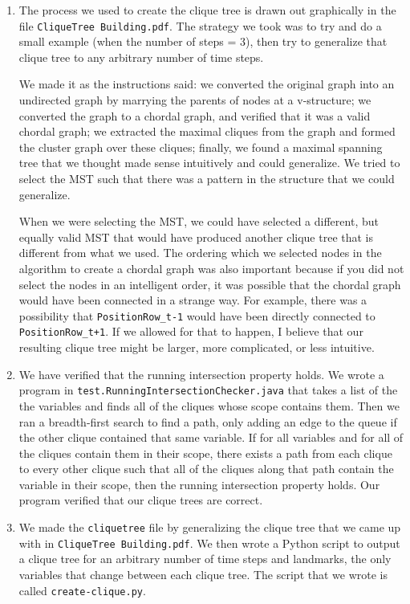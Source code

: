\documentclass[11pt,a4paper]{article}
\begin{document}
	\begin{enumerate}
		\item The process we used to create the clique tree is drawn out graphically
		in the file {\tt CliqueTree Building.pdf}. The strategy we took was to try and do
		a small example (when the number of steps = 3), then try to generalize
		that clique tree to any arbitrary number of time steps.
		
		We made it as the instructions said: we converted the original graph into an
		undirected graph by marrying the parents of nodes at a v-structure; we converted
		the graph to a chordal graph, and verified that it was a valid chordal graph; we 
		extracted the maximal cliques from the graph and formed the cluster graph over
		these cliques; finally, we found a maximal spanning tree that we thought made
		sense intuitively and could generalize. We tried to select the MST such that there
		was a pattern in the structure that we could generalize. 
		
		When we were selecting the MST, we could have selected a different, but equally 
		valid MST that would have produced another clique tree that is different from what 
		we used. The ordering which we selected nodes in the algorithm to create a chordal
		graph was also important because if you did not select the nodes in an intelligent
		order, it was possible that the chordal graph would have been connected in a strange
		way. For example, there was a possibility that {\tt PositionRow\_t-1} would have
		been directly connected to {\tt PositionRow\_t+1}. If we allowed for that to happen,
		I believe that our resulting clique tree might be larger, more complicated, or less
		intuitive.
		
		\item We have verified that the running intersection property holds. We wrote a 
		program in {\tt test.RunningIntersectionChecker.java} that takes a list of the
		the variables and finds all of the cliques whose scope contains them. Then we
		ran a breadth-first search to find a path, only adding an edge to the queue if the
		other clique contained that same variable. If for all variables and for all of the
		cliques contain them in their scope, there exists a path from each clique
		to every other clique such that all of the cliques along that path contain the
		variable in their scope, then the running intersection property holds. Our program
		verified that our clique trees are correct.
		
		\item We made the {\tt cliquetree} file by generalizing the clique tree that we
		came up with in {\tt CliqueTree Building.pdf}. We then wrote a Python script to
		output a clique tree for an arbitrary number of time steps and landmarks, the
		only variables that change between each clique tree. The script that we wrote is
		called {\tt create-clique.py}.
	\end{enumerate}		
	
\end{document}
